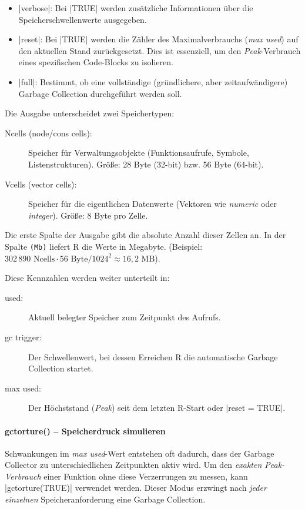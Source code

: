 \documentclass[10pt,twocolumn]{scrartcl}
\renewcommand{\lstinline}{\mycoloredinline}
\begin{document}
\begin{itemize}
\item \lstinline|verbose|: Bei \lstinline|TRUE| werden zusätzliche Informationen über die Speicherschwellenwerte ausgegeben.
\item \lstinline|reset|: Bei \lstinline|TRUE| werden die Zähler des Maximalverbrauchs (\emph{max used}) auf den aktuellen Stand zurückgesetzt. Dies ist essenziell, um den \emph{Peak}-Verbrauch eines spezifischen Code-Blocks zu isolieren.
\item \lstinline|full|: Bestimmt, ob eine vollständige (gründlichere, aber zeitaufwändigere) Garbage Collection durchgeführt werden soll.
\end{itemize}

Die Ausgabe unterscheidet zwei Speichertypen:
\begin{description}
\item[Ncells (node/cons cells):] Speicher für Verwaltungsobjekte (Funktionsaufrufe, Symbole, Listenstrukturen). Größe: 28 Byte (32-bit) bzw. 56 Byte (64-bit).
\item[Vcells (vector cells):] Speicher für die eigentlichen Datenwerte (Vektoren wie \emph{numeric} oder \emph{integer}). Größe: 8 Byte pro Zelle.
\end{description}

Die erste Spalte der Ausgabe gibt die absolute Anzahl dieser Zellen an. In der Spalte \texttt{(Mb)} liefert R die Werte in Megabyte. 
(Beispiel: $302\,890 \text{ Ncells} \cdot 56 \text{ Byte} / 1024^2 \approx 16,2 \text{ MB}$).

Diese Kennzahlen werden weiter unterteilt in:
\begin{description}
\item[used:] Aktuell belegter Speicher zum Zeitpunkt des Aufrufs.
\item[gc trigger:] Der Schwellenwert, bei dessen Erreichen R die automatische Garbage Collection startet.
\item[max used:] Der Höchststand (\emph{Peak}) seit dem letzten R-Start oder \lstinline|reset = TRUE|.
\end{description}

\paragraph{gctorture() -- Speicherdruck simulieren}

Schwankungen im \emph{max used}-Wert entstehen oft dadurch, dass der Garbage Collector zu unterschiedlichen Zeitpunkten aktiv wird. Um den \emph{exakten Peak-Verbrauch} einer Funktion ohne diese Verzerrungen zu messen, kann \lstinline|gctorture(TRUE)| verwendet werden. Dieser Modus erzwingt nach \emph{jeder einzelnen} Speicheranforderung eine Garbage Collection.
\end{document}

